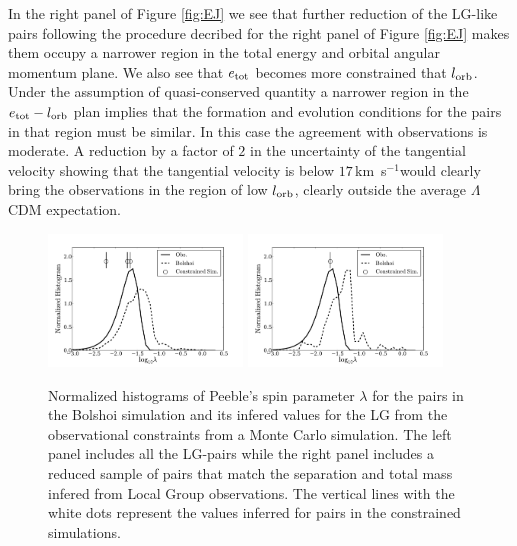 \documentclass{emulateapj}
\newcommand{\kms}{\,km~s$^{-1}$}
\begin{document}
In the right panel of Figure \ref{fig:EJ} we see that further reduction of the LG-like pairs following the procedure decribed for the right panel of Figure \ref{fig:EJ} makes them occupy a narrower region in the total energy and orbital angular momentum plane. We also see that $e_{\rm tot}$ becomes more constrained that $l_{\rm orb}$. Under the assumption of quasi-conserved quantity a narrower region in the $e_{\rm tot}-l_{\rm orb}$ plan implies that the formation and evolution conditions for the pairs in that region must be similar. In this case the agreement with observations is moderate. A reduction by a factor of $2$ in the uncertainty of the tangential velocity showing that the tangential velocity is below $17$\kms would clearly bring the observations in the region of low $l_{\rm orb}$, clearly outside the average $\Lambda$CDM expectation.


\begin{figure}
\begin{center}
\includegraphics[keepaspectratio=true,width=0.46\textwidth]{./figures/test_lambda_BDM.pdf}
\includegraphics[keepaspectratio=true,width=0.46\textwidth]{./figures/test_lambda_BDM_narrow.pdf}
\caption{{\rm \label{fig:lambda} Normalized histograms of Peeble's spin parameter $\lambda$ for the pairs in the Bolshoi simulation and its infered values for the LG from the observational constraints from a Monte Carlo simulation. The left panel includes all the LG-pairs while the right panel includes a reduced sample of pairs that match the separation and total mass infered from Local Group observations. The vertical lines with the white dots represent the values inferred for pairs in the constrained simulations.}}
\label{fig:lambda}
\end{center}
\end{figure}
\end{document}
